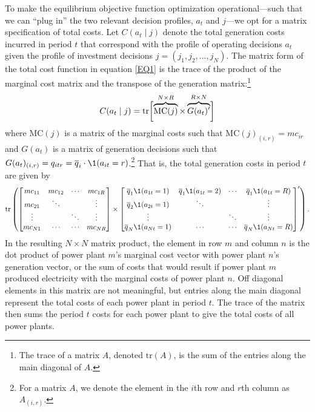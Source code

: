 To make the equilibrium objective function optimization operational---such that we can ``plug in'' the two relevant decision profiles, $a_t$ and $j$---we opt for a matrix specification of total costs. Let $C(a_t \mid j)$ denote the total generation costs incurred in period $t$ that correspond with the profile of operating decisions $a_t$ given the profile of investment decisions $j = (j_1, j_2, \ldots, j_N)$. The matrix form of the total cost function in equation \eqref{EQ1} is the trace of the product of the marginal cost matrix and the transpose of the generation matrix:\footnote{The trace of a matrix $A$, denoted $\text{tr}(A)$, is the sum of the entries along the main diagonal of $A$.} 
\begin{equation}\label{C_matrix}
    C (a_t \mid j) = \text{tr}\biggl[ \overbrace{\text{MC}(j)}^{N \times R} \times \overbrace{G(a_t)'}^{R \times N} \biggr] \\
\end{equation}
where $\text{MC}(j)$ is a matrix of the marginal costs such that $\text{MC}(j)_{(i,r)} = mc_{ir}$ and $G(a_t)$ is a matrix of generation decisions such that $G(a_t)_{(i,r)} = q_{itr} = \overline{q}_i \cdot \1(a_{it} = r)$.\footnote{For a matrix $A$, we denote the element in the $i$th row and $r$th column as $A_{(i,r)}$.} That is, the total generation costs in period $t$ are given by
\[
    \text{tr}\left( 
        \begin{bmatrix}
            mc_{11} & mc_{12} & \cdots & mc_{1R} \\
            mc_{21} & \ddots & & \vdots \\
            \vdots & & \ddots & \vdots \\
            mc_{N1} & \cdots & \cdots  & mc_{NR} 
        \end{bmatrix} \times \begin{bmatrix}
            \overline{q}_1 \1(a_{1t} = 1) & \overline{q}_1 \1(a_{1t} = 2) & \cdots & \overline{q}_1 \1(a_{1t} = R) \\
            \overline{q}_2 \1(a_{2t} = 1) & \ddots & & \vdots \\
            \vdots & & \ddots & \vdots \\
            \overline{q}_N  \1(a_{Nt} = 1) & \cdots & \cdots  & \overline{q}_N  \1(a_{Nt} = R) 
        \end{bmatrix}'
    \right).
\]
In the resulting $N \times N$ matrix product, the element in row $m$ and column $n$ is the dot product of power plant $m$'s marginal cost vector with power plant $n$'s generation vector, or the sum of costs that would result if power plant $m$ produced electricity with the marginal costs of power plant $n$. Off diagonal elements in this matrix are not meaningful, but entries along the main diagonal represent the total costs of each power plant in period $t$. The trace of the matrix then sums the period $t$ costs for each power plant to give the total costs of all power plants.

